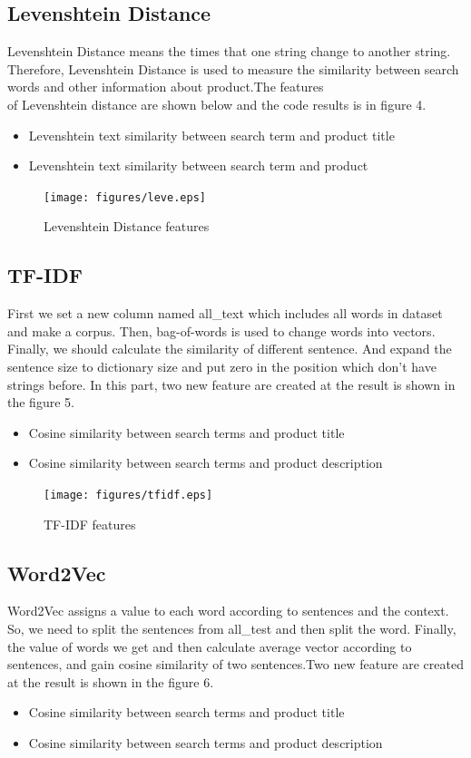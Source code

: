 \subsection{Levenshtein Distance}
Levenshtein Distance means the times that one string change to another string. Therefore, Levenshtein Distance is used to measure the similarity between search words and other information about product.The features 
	\smallskip
\\of Levenshtein distance are shown below and the code results is in figure 4.
\begin{itemize}
	\item Levenshtein text similarity between search term and product title
	\item Levenshtein text similarity between search term and product
\end{itemize}
	\begin{figure}[htb]
	\centering
	\texttt{[image: figures/leve.eps]}
	\caption{Levenshtein Distance features
	}\label{straddltimeScale}
\end{figure}

\subsection{TF-IDF}
First we set a new column named all_text which includes all words in dataset and make a corpus. Then, bag-of-words is used to change words into vectors. Finally, we should calculate the similarity of different sentence. And expand the sentence size to dictionary size and put zero in the position which don't have strings before. In this part, two new feature are created at the result is shown in the figure 5.

\begin{itemize}
	\item Cosine similarity between search terms and product title
	\item Cosine similarity between search terms and product description
\end{itemize}
\begin{figure}[htb]
	\centering
	\texttt{[image: figures/tfidf.eps]}
	\caption{TF-IDF features
	}\label{straddltimeScale}
\end{figure}

\subsection{Word2Vec}
Word2Vec assigns a value to each word according to sentences and the context. So, we need to split the sentences from all_test and then split the word. Finally, the value of words we get and then calculate average vector according to sentences, and gain cosine similarity of two sentences.Two new feature are created at the result is shown in the figure 6.
\begin{itemize}
	\item Cosine similarity between search terms and product title
	\item Cosine similarity between search terms and product description
\end{itemize}

